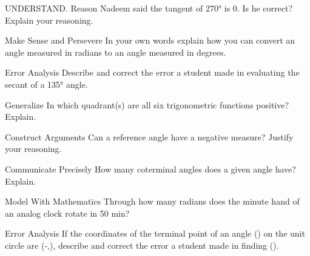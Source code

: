 \documentclass{article}
\newenvironment{practice}[2]{}{}        %
\newcommand{\answer}[1]{}               %
\newcommand{\te}[1]{}                   %
\begin{document}
\begin{practice}{12}{1}
UNDERSTAND. Reason Nadeem said the tangent of 270° is 0. Is he correct? Explain your reasoning.
\answer{No, the tangent of 270° is undefined because zero is in the denominator.}
\end{practice}
\begin{practice}{13}{2}
Make Sense and Persevere In your own words explain how you can convert an angle measured in radians to an angle measured in degrees.
\answer{Multiply the number of radians by (\frac{180°}{\pi}).}
\end{practice}
\begin{practice}{14}{1}
Error Analysis Describe and correct the error a student made in evaluating the secant of a 135° angle.
\te{Student work with red X: The coordinates of the terminal point on the unit circle are (-\frac{\sqrt2}{2},\frac{\sqrt2}{2}). (\sec135°=\frac{-\frac{\sqrt2}{2}}1=-\frac{\sqrt2}{2}).}
\answer{The student found the cosine of 135° rather than its reciprocal function, secant. The secant of 135° is (\sqrt2).}
\te{Printed positive (\sqrt2); likely (-\sqrt2).}
\end{practice}
\begin{practice}{15}{1}
Generalize In which quadrant(s) are all six trigonometric functions positive? Explain.
\answer{in Quadrant I, because that is the only quadrant in which the x-coordinate and the y-coordinate of the terminal point are both positive}
\end{practice}
\begin{practice}{16}{2}
Construct Arguments Can a reference angle have a negative measure? Justify your reasoning.
\answer{No, a reference angle must be an acute angle, which by definition must measure between 0° and 90°}
\end{practice}
\begin{practice}{17}{2}
Communicate Precisely How many coterminal angles does a given angle have? Explain.
\answer{Infinitely many since any given angle can have an infinite number of coterminal angles. If the angle is measured in degrees, you can keep adding multiples of 360° or -360°; if the angle is measured in radians, you can keep adding multiples of (2\pi) or (-2\pi) to it.}
\end{practice}
\begin{practice}{18}{2}
Model With Mathematics Through how many radians does the minute hand of an analog clock rotate in 50 min?
\answer{(\frac53\pi) radians}
\end{practice}
\begin{practice}{19}{2}
Error Analysis If the coordinates of the terminal point of an angle (\theta) on the unit circle are (-,), describe and correct the error a student made in finding (\tan\theta).
\te{Student work with red X: (\tan\theta=\frac{-\frac35}{\frac45}=-\frac34).}
\answer{The (\tan\theta) is (\frac{\sin\theta}{\cos\theta}). The student wrote the reciprocal of the tangent. (\tan\theta=-\frac43)}
\end{practice}
\end{document}
